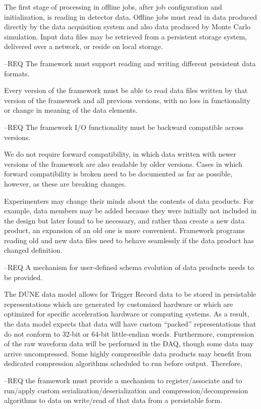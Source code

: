 \documentclass[../main-v1.tex]{subfiles}
\begin{document}
The first stage of processing in offline jobs, after job configuration and initialization, is reading in detector data.  Offline jobs must read in data produced directly by the data acquisition system and also data produced by Monte Carlo simulation.  Input data files may be retrieved from a persistent storage system, delivered over a network, or reside on local storage.

--REQ The framework must support reading and writing different persistent data formats.

Every version of the framework must be able to read data files written by that version of the framework and all previous versions, with no loss in functionality or change in meaning of the data elements.

--REQ The framework I/O functionality must be backward compatible across versions.  

We do not require forward compatibility, in which data written with newer versions of the framework are also readable by older versions.  Cases in which forward compatibility is broken need to be documented as far as possible, however, as these are breaking changes.  

Experimenters may change their minds about the contents of data products.  For example, data members may be added because they were initially not included in the design but later found to be necessary, and rather than create a new data product, an expansion of an old one is more convenient.  Framework programs reading old and new data files need to behave seamlessly if the data product has changed definition.

--REQ A mechanism for user-defined schema evolution of data products needs to be provided.

The DUNE data model allows for Trigger Record data to be stored in persistable representations which are generated by customized hardware or which are optimized for specific acceleration hardware or computing systems.  As a result, the data model expects that data will have custom “packed” representations that do not conform to 32-bit or 64-bit little-endian words. Furthermore, compression of the raw waveform data will be performed in the DAQ, though some data may arrive uncompressed.  Some highly compressible data products may benefit from dedicated compression algorithms scheduled to run before output. Therefore, 

--REQ the framework must provide a mechanism to register/associate and to run/apply custom serialization/deserialization and compression/decompression algorithms to data on write/read of that data from a persistable form.  
\end{document}
